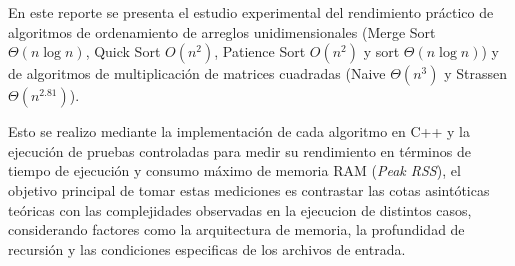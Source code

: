 En este reporte se presenta el estudio experimental
del rendimiento práctico de algoritmos de ordenamiento
de arreglos unidimensionales (Merge Sort $\Theta(n \log n)$, 
Quick Sort $O(n^2)$, Patience Sort $O(n^2)$ y sort $\Theta(n \log n)$)
y de algoritmos de multiplicación de matrices cuadradas 
(Naive $\Theta(n^3)$ y Strassen $\Theta(n^{2.81})$).

\vspace{0.4cm}

Esto se realizo mediante la implementación de cada algoritmo
en C++ y la ejecución de pruebas controladas para medir su
rendimiento en términos de tiempo de ejecución y consumo máximo
de memoria RAM (\textit{Peak RSS}), el objetivo principal de 
tomar estas mediciones es contrastar las cotas asintóticas
teóricas con las complejidades observadas en la ejecucion de 
distintos casos, considerando factores como la arquitectura
de memoria, la profundidad de recursión y las condiciones 
especificas de los archivos de entrada.